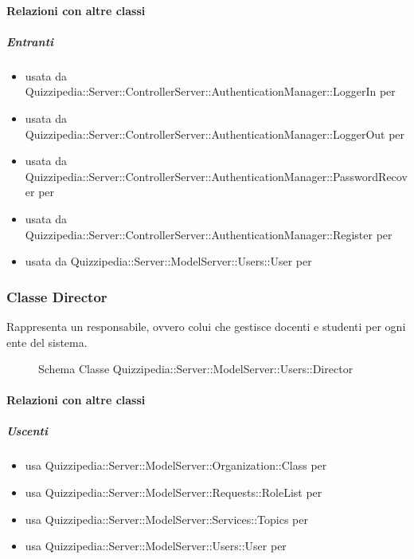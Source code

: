 \paragraph{Relazioni con altre classi}
\subparagraph{Entranti}
\begin{itemize}
\item usata da Quizzipedia::Server::ControllerServer::AuthenticationManager::LoggerIn per 
\item usata da Quizzipedia::Server::ControllerServer::AuthenticationManager::LoggerOut per 
\item usata da Quizzipedia::Server::ControllerServer::AuthenticationManager::PasswordRecover per 
\item usata da Quizzipedia::Server::ControllerServer::AuthenticationManager::Register per 
\item usata da Quizzipedia::Server::ModelServer::Users::User per 
\end{itemize}
\subsubsection{Classe Director}
Rappresenta un responsabile, ovvero colui che gestisce docenti e studenti per ogni ente del sistema.
\begin{figure}[H]
\centering
\noindent{}
\caption[Schema Classe Director]{Schema Classe Quizzipedia::Server::ModelServer::Users::Director}
\end{figure}
\paragraph{Relazioni con altre classi}
\subparagraph{Uscenti}
\begin{itemize}
\item usa Quizzipedia::Server::ModelServer::Organization::Class per 
\item usa Quizzipedia::Server::ModelServer::Requests::RoleList per 
\item usa Quizzipedia::Server::ModelServer::Services::Topics per 
\item usa Quizzipedia::Server::ModelServer::Users::User per 
\end{itemize}
